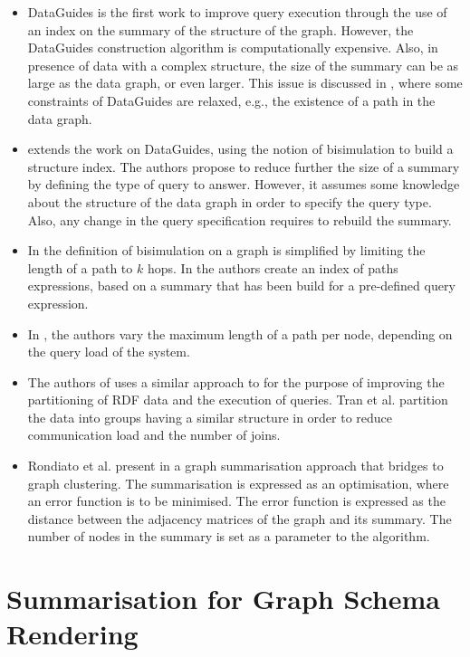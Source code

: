 \begin{itemize}
\item DataGuides \cite{goldman1997dataguides} is the first work to improve query execution through the use of an index on the summary of the structure of the graph. However, the DataGuides construction algorithm is computationally expensive. Also, in presence of data with a complex structure, the size of the summary can be as large as the data graph, or even larger. This issue is discussed in \cite{goldman1999approximate}, where some constraints of DataGuides are relaxed, e.g., the existence of a path in the data graph.
\item \cite{Milo:1999:ISP:645503.656266} extends the work on DataGuides, using the notion of bisimulation to build a structure index. The authors propose to reduce further the size of a summary by defining the type of query to answer. However, it assumes some knowledge about the structure of the data graph in order to specify the query type. Also, any change in the query specification requires to rebuild the summary.
\item In \cite{kaushik:de:2002} the definition of bisimulation on a graph is simplified by limiting the length of a path to $k$ hops. In \cite{kaushik:2002:cib} the authors create an index of paths expressions, based on a summary that has been build for a pre-defined query expression.
\item In \cite{chen:2003:dia}, the authors vary the maximum length of a path per node, depending on the query load of the system.
\item The authors of \cite{Tran:2012:kde} uses a similar approach to \cite{kaushik:2002:cib} for the purpose of improving the partitioning of RDF data and the execution of queries. Tran et al. partition the data into groups having a similar structure in order to reduce communication load and the number of joins.
\item Rondiato et al. present in \cite{riondato:2014:gsq} a graph summarisation approach that bridges to graph clustering. The summarisation is expressed as an optimisation, where an error function is to be minimised. The error function is expressed as the distance between the adjacency matrices of the graph and its summary. The number of nodes in the summary is set as a parameter to the algorithm.
\end{itemize}

\section{Summarisation for Graph Schema Rendering}

